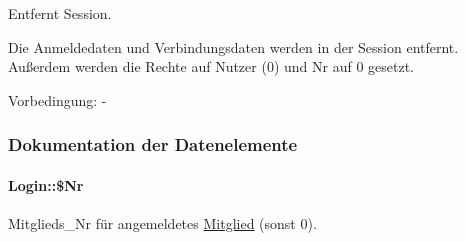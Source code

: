 Entfernt Session. 

Die Anmeldedaten und Verbindungsdaten werden in der Session entfernt. Außerdem werden die Rechte auf Nutzer (0) und Nr auf 0 gesetzt. \begin{Desc}
\item[Vorbedingung:]-\end{Desc}


\subsubsection{Dokumentation der Datenelemente}
\hypertarget{classLogin_227dede2a7c9c25b1e103b32de62d4df}{
\paragraph[\$Nr]{\setlength{\rightskip}{0pt plus 5cm}Login::\$Nr}\hfill}
\label{classLogin_227dede2a7c9c25b1e103b32de62d4df}


Mitglieds\_\-Nr für angemeldetes \hyperlink{classMitglied}{Mitglied} (sonst 0). 

